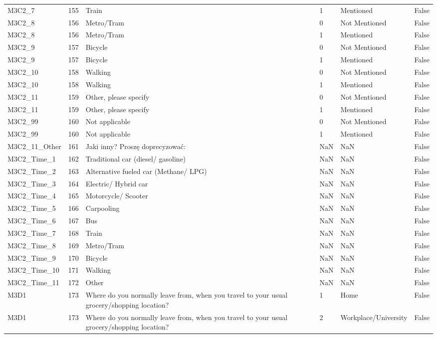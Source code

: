 \begin{tabular}{lrlllr}
M3C2_7 & 155 & Train & 1 & Mentioned & False \\
M3C2_8 & 156 & Metro/Tram & 0 & Not Mentioned & False \\
M3C2_8 & 156 & Metro/Tram & 1 & Mentioned & False \\
M3C2_9 & 157 & Bicycle & 0 & Not Mentioned & False \\
M3C2_9 & 157 & Bicycle & 1 & Mentioned & False \\
M3C2_10 & 158 & Walking & 0 & Not Mentioned & False \\
M3C2_10 & 158 & Walking & 1 & Mentioned & False \\
M3C2_11 & 159 & Other, please specify & 0 & Not Mentioned & False \\
M3C2_11 & 159 & Other, please specify & 1 & Mentioned & False \\
M3C2_99 & 160 & Not applicable & 0 & Not Mentioned & False \\
M3C2_99 & 160 & Not applicable & 1 & Mentioned & False \\
M3C2_11_Other & 161 & Jaki inny? Proszę doprecyzować: & NaN & NaN & False \\
M3C2_Time_1 & 162 & Traditional car (diesel/ gasoline) & NaN & NaN & False \\
M3C2_Time_2 & 163 & Alternative fueled car (Methane/ LPG) & NaN & NaN & False \\
M3C2_Time_3 & 164 & Electric/ Hybrid car & NaN & NaN & False \\
M3C2_Time_4 & 165 & Motorcycle/ Scooter & NaN & NaN & False \\
M3C2_Time_5 & 166 & Carpooling & NaN & NaN & False \\
M3C2_Time_6 & 167 & Bus & NaN & NaN & False \\
M3C2_Time_7 & 168 & Train & NaN & NaN & False \\
M3C2_Time_8 & 169 & Metro/Tram & NaN & NaN & False \\
M3C2_Time_9 & 170 & Bicycle & NaN & NaN & False \\
M3C2_Time_10 & 171 & Walking & NaN & NaN & False \\
M3C2_Time_11 & 172 & Other & NaN & NaN & False \\
M3D1 & 173 & Where do you normally leave from, when you travel to your usual grocery/shopping location? & 1 & Home & False \\
M3D1 & 173 & Where do you normally leave from, when you travel to your usual grocery/shopping location? & 2 & Workplace/University & False \\

\end{tabular}
